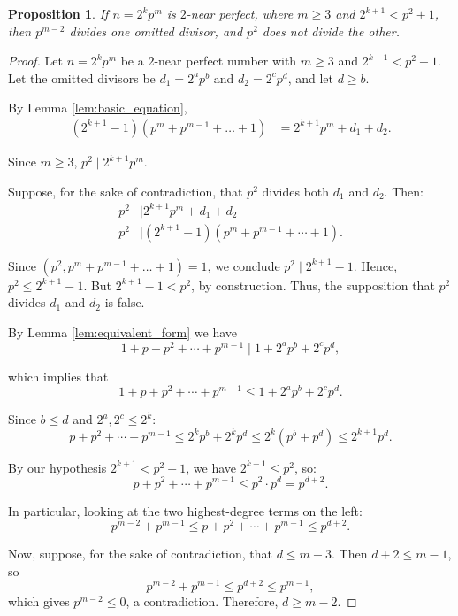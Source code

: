 \documentclass[10pt]{article}
\newtheorem{proposition}{Proposition}
\theoremstyle{definition}
\begin{document}
\begin{proposition}\label{prop:p_divisibility_constraint}
   If $n=2^kp^m$ is $2$-near perfect, where $m\ge3$ and $2^{k+1}<p^2+1$, then $p^{m-2}$ divides one omitted divisor, and $p^2$ does not divide the other. 
\end{proposition}

\begin{proof}
    Let $n=2^kp^m$ be a $2$-near perfect number with $m\ge3$ and $2^{k+1}<p^2+1$. Let the omitted divisors be $d_1=2^ap^b$ and $d_2=2^cp^d$, and let $d\ge b$.

    By Lemma \ref{lem:basic_equation},
    \begin{align*}
        (2^{k+1}-1)(p^m+p^{m-1}+\dots+1)&=2^{k+1}p^{m}+d_1+d_2.
    \end{align*}

    Since $m\ge3$, $p^2\mid2^{k+1}p^m$.
    
    Suppose, for the sake of contradiction, that $p^2$ divides both $d_1$ and $d_2$. Then:
    \begin{align*}
        p^2&\mid2^{k+1}p^{m}+d_1+d_2\\
        p^2&\mid(2^{k+1}-1)(p^m+p^{m-1}+ \cdots +1).
    \end{align*}

    Since $(p^2,p^m+p^{m-1}+\dots+1)=1$, we conclude $p^2\mid2^{k+1}-1$. Hence, $p^2\le2^{k+1}-1$. But $2^{k+1}-1<p^2$, by construction. Thus, the supposition that $p^2$ divides $d_1$ and $d_2$ is false.

    By Lemma \ref{lem:equivalent_form} we have %
    \[1+p+p^2+\cdots+p^{m-1}\mid1+2^ap^b+2^cp^d,\]

    which implies that
    \[1+p+p^2+\cdots+p^{m-1}\le1+2^ap^b+2^cp^d.\]
    
    Since $b \leq d$ and $2^a,2^c \leq 2^k$:
    \[p+p^2+\cdots+p^{m-1}\le2^kp^b+2^kp^d \leq 2^k(p^b+p^d) \leq 2^{k+1}p^d.\]
    
    By our hypothesis $2^{k+1}<p^2+1$, we have $2^{k+1} \leq p^2$, so:
    \[p+p^2+\cdots+p^{m-1}\le p^2 \cdot p^d = p^{d+2}.\]
    
    In particular, looking at the two highest-degree terms on the left:
    \[p^{m-2}+p^{m-1}\le p+p^2+\cdots+p^{m-1}\le p^{d+2}.\]

    Now, suppose, for the sake of contradiction, that $d \leq m-3$. Then $d+2 \leq m-1$, so
    \[p^{m-2}+p^{m-1}\le p^{d+2} \leq p^{m-1},\]
    which gives $p^{m-2} \leq 0$, a contradiction. Therefore, $d \geq m-2$.
\end{proof}
\end{document}
